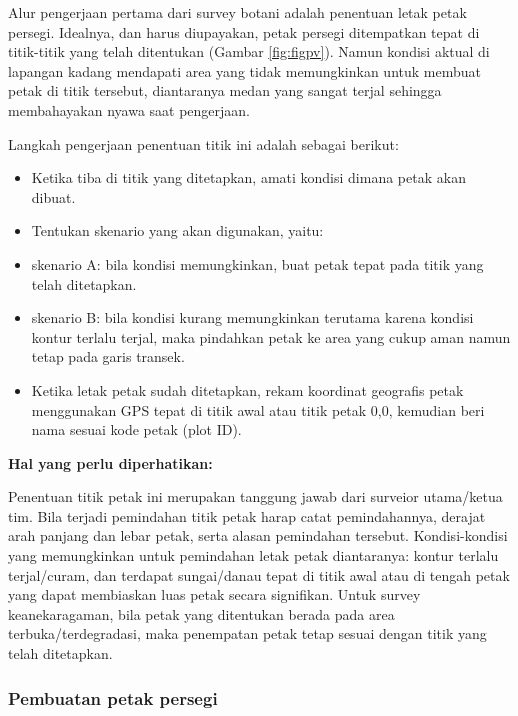 \documentclass[
]{book}
\providecommand{\tightlist}{%
  \setlength{\itemsep}{0pt}\setlength{\parskip}{0pt}}
\begin{document}
Alur pengerjaan pertama dari survey botani adalah penentuan letak petak persegi. Idealnya, dan harus diupayakan, petak persegi ditempatkan tepat di titik-titik yang telah ditentukan (Gambar \ref{fig:figpv}). Namun kondisi aktual di lapangan kadang mendapati area yang tidak memungkinkan untuk membuat petak di titik tersebut, diantaranya medan yang sangat terjal sehingga membahayakan nyawa saat pengerjaan.

Langkah pengerjaan penentuan titik ini adalah sebagai berikut:

\begin{itemize}
\tightlist
\item
  Ketika tiba di titik yang ditetapkan, amati kondisi dimana petak akan dibuat.
\item
  Tentukan skenario yang akan digunakan, yaitu:
\item
  skenario A: bila kondisi memungkinkan, buat petak tepat pada titik yang telah ditetapkan.
\item
  skenario B: bila kondisi kurang memungkinkan terutama karena kondisi kontur terlalu terjal, maka pindahkan petak ke area yang cukup aman namun tetap pada garis transek.
\item
  Ketika letak petak sudah ditetapkan, rekam koordinat geografis petak menggunakan GPS tepat di titik awal atau titik petak 0,0, kemudian beri nama sesuai kode petak (plot ID).
\end{itemize}

\textbf{Hal yang perlu diperhatikan:}

Penentuan titik petak ini merupakan tanggung jawab dari surveior utama/ketua tim. Bila terjadi pemindahan titik petak harap catat pemindahannya, derajat arah panjang dan lebar petak, serta alasan pemindahan tersebut. Kondisi-kondisi yang memungkinkan untuk pemindahan letak petak diantaranya: kontur terlalu terjal/curam, dan terdapat sungai/danau tepat di titik awal atau di tengah petak yang dapat membiaskan luas petak secara signifikan. Untuk survey keanekaragaman, bila petak yang ditentukan berada pada area terbuka/terdegradasi, maka penempatan petak tetap sesuai dengan titik yang telah ditetapkan.

\hypertarget{pembuatan-petak-persegi}{%
\subsubsection*{Pembuatan petak persegi}\label{pembuatan-petak-persegi}}
\end{document}
